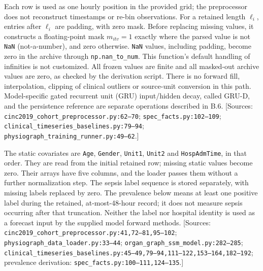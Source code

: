 Each row is used as one hourly position in the provided grid; the preprocessor does not reconstruct timestamps or re-bin observations. For a retained length \(\ell_i\), entries after \(\ell_i\) are padding, with zero mask. Before replacing missing values, it constructs a floating-point mask \(m_{itv}=1\) exactly where the parsed value is not \texttt{NaN} (not-a-number), and zero otherwise. \texttt{NaN} values, including padding, become zero in the archive through \texttt{np.\allowbreak{}nan\_\allowbreak{}to\_\allowbreak{}num}. This function's default handling of infinities is not customized. All frozen values are finite and all masked-out archive values are zero, as checked by the derivation script. There is no forward fill, interpolation, clipping of clinical outliers or source-unit conversion in this path. Model-specific gated recurrent unit (GRU) input/hidden decay, called GRU-D, and the persistence reference are separate operations described in B.6. [Sources: \texttt{cinc2019\_\allowbreak{}cohort\_\allowbreak{}preprocessor.\allowbreak{}py:\allowbreak{}62–\allowbreak{}70}; \texttt{spec\_\allowbreak{}facts.\allowbreak{}py:\allowbreak{}102–\allowbreak{}109}; \texttt{clinical\_\allowbreak{}timeseries\_\allowbreak{}baselines.\allowbreak{}py:\allowbreak{}79–\allowbreak{}94}; \texttt{physiograph\_\allowbreak{}training\_\allowbreak{}runner.\allowbreak{}py:\allowbreak{}49–\allowbreak{}62}.]

The static covariates are \texttt{Age}, \texttt{Gender}, \texttt{Unit1}, \texttt{Unit2} and \texttt{HospAdmTime}, in that order. They are read from the initial retained row; missing static values become zero. Their arrays have five columns, and the loader passes them without a further normalization step. The sepsis label sequence is stored separately, with missing labels replaced by zero. The prevalence below means at least one positive label during the retained, at-most-48-hour record; it does not measure sepsis occurring after that truncation. Neither the label nor hospital identity is used as a forecast input by the supplied model forward methods. [Sources: \texttt{cinc2019\_\allowbreak{}cohort\_\allowbreak{}preprocessor.\allowbreak{}py:\allowbreak{}41,\allowbreak{}72–\allowbreak{}81,\allowbreak{}95–\allowbreak{}102}; \texttt{physiograph\_\allowbreak{}data\_\allowbreak{}loader.\allowbreak{}py:\allowbreak{}33–\allowbreak{}44}; \texttt{organ\_\allowbreak{}graph\_\allowbreak{}ssm\_\allowbreak{}model.\allowbreak{}py:\allowbreak{}282–\allowbreak{}285}; \texttt{clinical\_\allowbreak{}timeseries\_\allowbreak{}baselines.\allowbreak{}py:\allowbreak{}45–\allowbreak{}49,\allowbreak{}79–\allowbreak{}94,\allowbreak{}111–\allowbreak{}122,\allowbreak{}153–\allowbreak{}164,\allowbreak{}182–\allowbreak{}192}; prevalence derivation: \texttt{spec\_\allowbreak{}facts.\allowbreak{}py:\allowbreak{}100–\allowbreak{}111,\allowbreak{}124–\allowbreak{}135}.]

